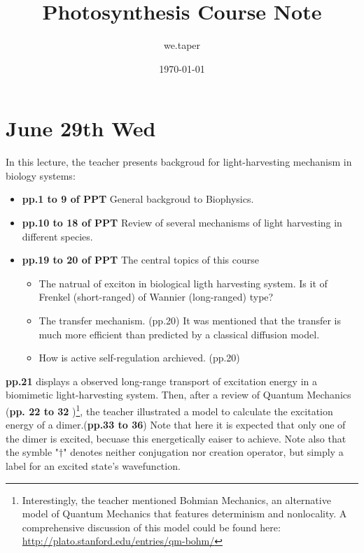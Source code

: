 \documentclass{article}
\title{Photosynthesis Course Note}
\date{\today}
\author{we.taper}
\numberwithin{equation}{subsection} %
\theoremstyle{definition}
\begin{document}
\maketitle

\tableofcontents

\section{June 29th Wed}
\label{sec:June_29th}

In this lecture, the teacher presents backgroud for light-harvesting
mechanism in biology systems:
\begin{itemize}
    \item \textbf{pp.1 to 9 of PPT} 
        General backgroud to Biophysics.
    \item \textbf{pp.10 to 18 of PPT}
        Review of several mechanisms of light harvesting in different 
        species.
    \item \textbf{pp.19 to 20 of PPT}
        The central topics of this course
        \begin{itemize}
            \item The natrual of exciton in biological ligth harvesting 
                system.
                Is it of Frenkel (short-ranged) of Wannier (long-ranged) type?
            \item The transfer mechanism. (pp.20) It was mentioned that
                the transfer is much more efficient than predicted
                by a classical diffusion model.
            \item How is active self-regulation archieved. (pp.20)
        \end{itemize}
\end{itemize}
\textbf{pp.21} displays a observed long-range transport of excitation
    energy in a biomimetic light-harvesting system.
Then, after a review of Quantum Mechanics (\textbf{pp. 22 to 32} )\footnote{
    Interestingly, the teacher mentioned Bohmian Mechanics, an alternative
    model of Quantum Mechanics that features determinism and nonlocality.
    A comprehensive discussion of this model could be found here:
    \url{http://plato.stanford.edu/entries/qm-bohm/}
}, the teacher illustrated a model to calculate
the excitation energy of a dimer.(\textbf{pp.33 to 36})
Note that here it is expected that only one of the
dimer is excited, becuase this energetically eaiser to achieve.
Note also that the
symble "$\dagger$" denotes neither conjugation nor creation operator,
but simply a label for an excited state's wavefunction. 
\end{document}
